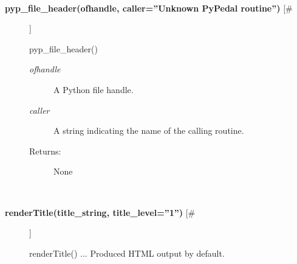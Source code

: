 \documentclass[10pt]{article}
\begin{document}
\begin{description}
\begin{description}
\end{description}
\\ 

\item[\textbf{pyp\_file\_header(ofhandle, caller=''Unknown PyPedal routine'')}
 [\#]]

 pyp\_file\_header()
\begin{description}
\item[\emph{ofhandle}
] A Python file handle.
\item[\emph{caller}
] A string indicating the name of the calling routine.
\item[Returns:] None

\end{description}
\\ 

\item[\textbf{renderTitle(title\_string, title\_level=''1'')}
 [\#]]

 renderTitle() ... Produced HTML output by default.


\end{description}
\end{document}
